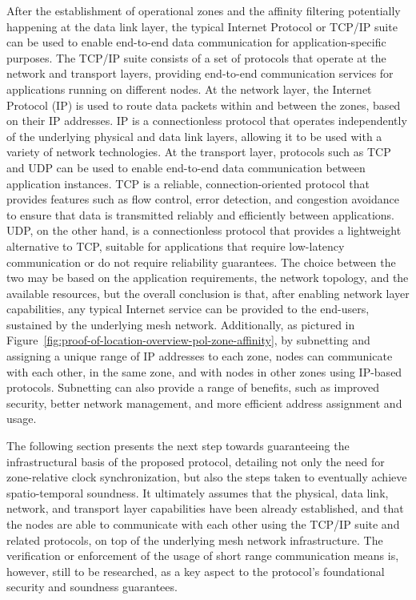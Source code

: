 After the establishment of operational zones and the affinity filtering potentially happening at the data link layer, the typical Internet Protocol or TCP/IP suite can be used to enable end-to-end data communication for application-specific purposes. The TCP/IP suite consists of a set of protocols that operate at the network and transport layers, providing end-to-end communication services for applications running on different nodes. At the network layer, the Internet Protocol (IP) is used to route data packets within and between the zones, based on their IP addresses. IP is a connectionless protocol that operates independently of the underlying physical and data link layers, allowing it to be used with a variety of network technologies. At the transport layer, protocols such as TCP and UDP can be used to enable end-to-end data communication between application instances. TCP is a reliable, connection-oriented protocol that provides features such as flow control, error detection, and congestion avoidance to ensure that data is transmitted reliably and efficiently between applications. UDP, on the other hand, is a connectionless protocol that provides a lightweight alternative to TCP, suitable for applications that require low-latency communication or do not require reliability guarantees. The choice between the two may be based on the application requirements, the network topology, and the available resources, but the overall conclusion is that, after enabling network layer capabilities, any typical Internet service can be provided to the end-users, sustained by the underlying mesh network. Additionally, as pictured in Figure~\ref{fig:proof-of-location-overview-pol-zone-affinity}, by subnetting and assigning a unique range of IP addresses to each zone, nodes can communicate with each other, in the same zone, and with nodes in other zones using IP-based protocols. Subnetting can also provide a range of benefits, such as improved security, better network management, and more efficient address assignment and usage.

The following section presents the next step towards guaranteeing the infrastructural basis of the proposed \pol{} protocol, detailing not only the need for zone-relative clock synchronization, but also the steps taken to eventually achieve spatio-temporal soundness. It ultimately assumes that the physical, data link, network, and transport layer capabilities have been already established, and that the nodes are able to communicate with each other using the TCP/IP suite and related protocols, on top of the underlying mesh network infrastructure. The verification or enforcement of the usage of short range communication means is, however, still to be researched, as a key aspect to the protocol's foundational security and soundness guarantees.